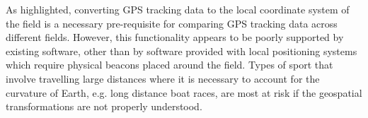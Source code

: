 \pagebreak{}

As highlighted, converting GPS tracking data to the local coordinate system of the field is a necessary pre-requisite for comparing GPS tracking data across different fields. However, this functionality appears to be poorly supported by existing software, other than by software provided with local positioning systems which require physical beacons placed around the field. Types of sport that involve travelling large distances where it is necessary to account for the curvature of Earth, e.g. long distance boat races, are most at risk if the geospatial transformations are not properly understood. %

